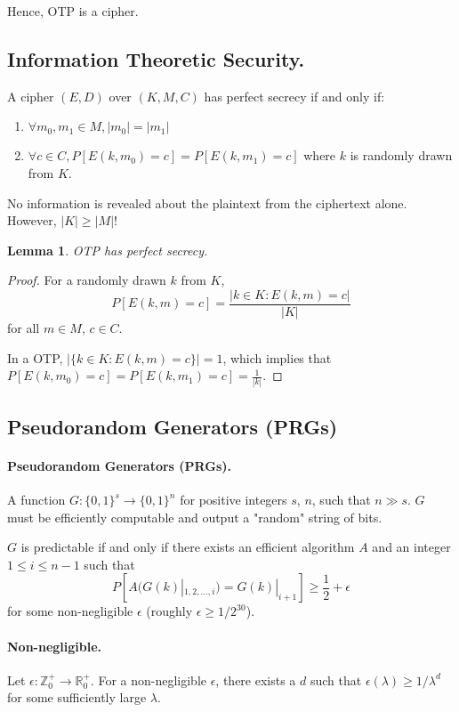 \documentclass{article}
\newtheorem{lemma}{Lemma}
\begin{document}
Hence, OTP is a cipher.

\subsection{Information Theoretic Security.} A cipher $(E, D)$ over $(K, M, C)$
has perfect secrecy if and only if: \begin{enumerate}
  \item $\forall m_0, m_1 \in M, |m_0| = |m_1|$
  \item $\forall c \in C, P[E(k, m_0) = c] = P[E(k, m_1) = c]$ where $k$ is
  randomly drawn from $K$.
\end{enumerate}

No information is revealed about the plaintext from the ciphertext alone.
However, $|K| \geq |M|$!

\begin{lemma}
  OTP has perfect secrecy.
\end{lemma}

\begin{proof}
  For a randomly drawn $k$ from $K$, $$P[E(k, m) = c] = \frac{|{k \in K: E(k,
  m) = c}|}{|K|}$$ for all $m \in M$, $c \in C$.

  In a OTP, $|\{k \in K: E(k, m) = c\}| = 1$, which implies that $P[E(k, m_0) =
  c] = P[E(k, m_1) = c] = \frac{1}{|k|}$.
\end{proof}

\subsection{Pseudorandom Generators (PRGs)}

\paragraph{Pseudorandom Generators (PRGs).} A function $G: \{0, 1\}^s
\rightarrow \{0, 1\}^n$ for positive integers $s$, $n$, such that $n \gg s$.
$G$ must be efficiently computable and output a "random" string of bits.

$G$ is predictable if and only if there exists an efficient algorithm $A$ and
an integer $1 \leq i \leq n-1$ such that \begin{equation}
  P[A(G(k)|_{1,2,\ldots,i}) = G(k)|_{i+1}] \geq \frac{1}{2} + \epsilon
  \label{prg:pred}
\end{equation} for some non-negligible $\epsilon$ (roughly $\epsilon \geq
1/2^{30}$).

\paragraph{Non-negligible.} Let $\epsilon: \mathbb{Z}^+_0 \rightarrow
\mathbb{R}^+_0$. For a non-negligible $\epsilon$, there exists a $d$ such that
$\epsilon(\lambda) \geq 1/\lambda^d$ for some sufficiently large $\lambda$.
\end{document}
